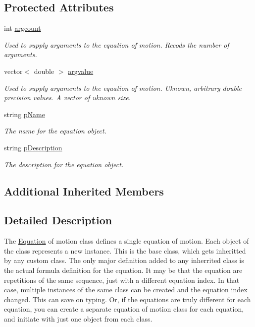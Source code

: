 \subsection*{Protected Attributes}
\begin{DoxyCompactItemize}
\item 
int \hyperlink{class_equationof_motion_ae3a0a566510eaabba1b78c9cad819153}{argcount}
\begin{DoxyCompactList}\small\item\em Used to supply arguments to the equation of motion. Recods the number of arguments. \end{DoxyCompactList}\item 
vector$<$ double $>$ \hyperlink{class_equationof_motion_a5a5b52c663f6f4970d4c99451b8b6bbb}{argvalue}
\begin{DoxyCompactList}\small\item\em Used to supply arguments to the equation of motion. Uknown, arbitrary double precision values. A vector of uknown size. \end{DoxyCompactList}\item 
string \hyperlink{class_equationof_motion_ad4657581e962d18d09c02734c9568006}{p\-Name}
\begin{DoxyCompactList}\small\item\em The name for the equation object. \end{DoxyCompactList}\item 
string \hyperlink{class_equationof_motion_a042a6741c1b526dcb40348dd89a6c5d5}{p\-Description}
\begin{DoxyCompactList}\small\item\em The description for the equation object. \end{DoxyCompactList}\end{DoxyCompactItemize}
\subsection*{Additional Inherited Members}


\subsection{Detailed Description}
The \hyperlink{class_equation}{Equation} of motion class defines a single equation of motion. Each object of the class represents a new instance. This is the base class, which gets inheritted by any custom class. The only major definition added to any inherrited class is the actual formula definition for the equation. It may be that the equation are repetitions of the same sequence, just with a different equation index. In that case, multiple instances of the same class can be created and the equation index changed. This can save on typing. Or, if the equations are truly different for each equation, you can create a separate equation of motion class for each equation, and initiate with just one object from each class.

